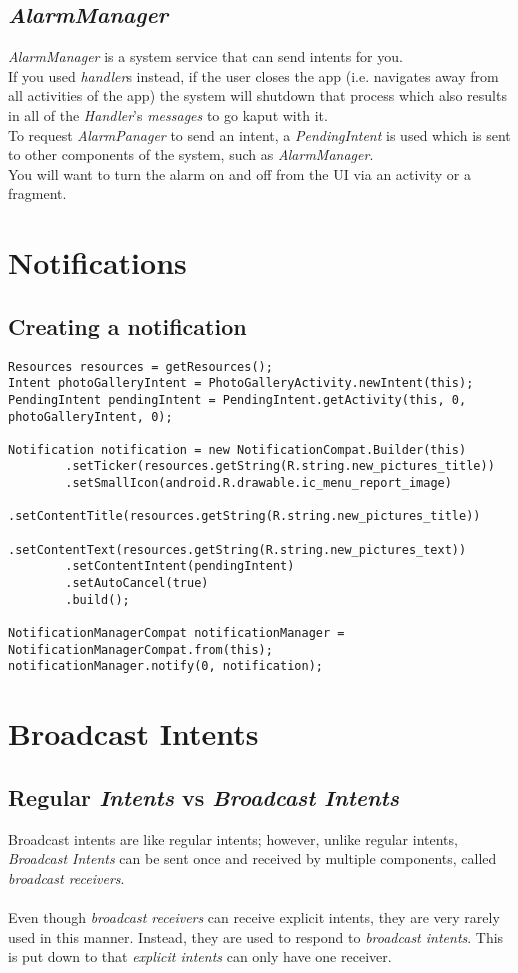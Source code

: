 \documentclass[]{article}
\renewcommand{\it}[1]{\textit{#1}}
\begin{document}
\subsection{\it{AlarmManager}}
\it{AlarmManager} is a system service that can send intents for you.
\\
If you used \it{handler}s instead, if the user closes the app (i.e. navigates away from all activities of the app) the system will shutdown that process which also results in all of the \it{Handler}'s \it{messages} to go kaput with it.
\\
To request \it{AlarmPanager} to send an intent, a \it{PendingIntent} is used which is sent to other components of the system, such as \it{AlarmManager}. 
\\
You will want to turn the alarm on and off from the UI via an activity or a fragment.

\section{Notifications}
\subsection{Creating a notification}
\begin{lstlisting}
Resources resources = getResources();
Intent photoGalleryIntent = PhotoGalleryActivity.newIntent(this);
PendingIntent pendingIntent = PendingIntent.getActivity(this, 0, photoGalleryIntent, 0);

Notification notification = new NotificationCompat.Builder(this)
		.setTicker(resources.getString(R.string.new_pictures_title))
		.setSmallIcon(android.R.drawable.ic_menu_report_image)
		.setContentTitle(resources.getString(R.string.new_pictures_title))
		.setContentText(resources.getString(R.string.new_pictures_text))
		.setContentIntent(pendingIntent)
		.setAutoCancel(true)
		.build();

NotificationManagerCompat notificationManager = NotificationManagerCompat.from(this);
notificationManager.notify(0, notification);
\end{lstlisting}

\section{Broadcast Intents}
\subsection{Regular \it{Intents} vs \it{Broadcast Intents}}
Broadcast intents are like regular intents; however, unlike regular intents, \it{Broadcast Intents} can be sent once and received by multiple components, called \it{broadcast receivers}.
\\\\
Even though \it{broadcast receivers} can receive explicit intents, they are very rarely used in this manner.  Instead, they are used to respond to \it{broadcast intents}.  This is put down to that \it{explicit intents} can only have one receiver.
\end{document}
